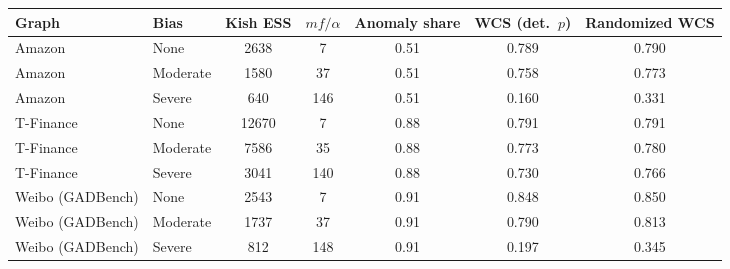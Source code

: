 \begin{tabular}{llccccc}
\toprule
Graph & Bias & Kish ESS & $mf/\alpha$ & Anomaly share & WCS (det.\ $p$) & Randomized WCS\\
\midrule
Amazon & None & 2638 & 7 & 0.51 & 0.789 & 0.790\\
Amazon & Moderate & 1580 & 37 & 0.51 & 0.758 & 0.773\\
Amazon & Severe & 640 & 146 & 0.51 & 0.160 & 0.331\\
T-Finance & None & 12670 & 7 & 0.88 & 0.791 & 0.791\\
T-Finance & Moderate & 7586 & 35 & 0.88 & 0.773 & 0.780\\
T-Finance & Severe & 3041 & 140 & 0.88 & 0.730 & 0.766\\
Weibo (GADBench) & None & 2543 & 7 & 0.91 & 0.848 & 0.850\\
Weibo (GADBench) & Moderate & 1737 & 37 & 0.91 & 0.790 & 0.813\\
Weibo (GADBench) & Severe & 812 & 148 & 0.91 & 0.197 & 0.345\\
\bottomrule
\end{tabular}
